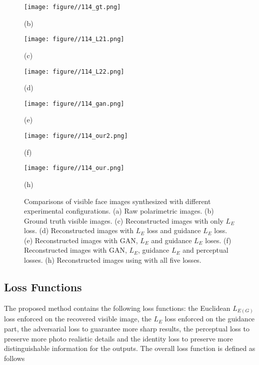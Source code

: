 \documentclass[10pt,twocolumn,letterpaper]{article}
\begin{document}
\begin{figure*}[!]
	\begin{minipage}{.135\textwidth}
		\centering
		\texttt{[image: figure//114\_gt.png]}
		\captionsetup{labelformat=empty}
		\captionsetup{justification=centering}
		\caption*{(b)}
	\end{minipage}
	\begin{minipage}{.135\textwidth}
		\centering
		\texttt{[image: figure//114\_L21.png]}
		\captionsetup{labelformat=empty}
		\captionsetup{justification=centering}
    	\caption*{(c)}
	\end{minipage}	
	\begin{minipage}{.135\textwidth}
			\centering
			\texttt{[image: figure//114\_L22.png]}
			\captionsetup{labelformat=empty}
			\captionsetup{justification=centering}
			\caption*{(d)}
	\end{minipage}
	\begin{minipage}{.135\textwidth}
		\centering
		\texttt{[image: figure//114\_gan.png]}
		\captionsetup{labelformat=empty}
		\captionsetup{justification=centering}
		\caption*{(e)}
	\end{minipage}
	\begin{minipage}{.135\textwidth}
		\centering
		\texttt{[image: figure//114\_our2.png]}
		\captionsetup{labelformat=empty}
		\captionsetup{justification=centering}
    	\caption*{(f)}
	\end{minipage}
	\begin{minipage}{.135\textwidth}
		\centering
		\texttt{[image: figure//114\_our.png]}
		\captionsetup{labelformat=empty}
		\captionsetup{justification=centering}
    	\caption*{(h)}
	\end{minipage}
	\vskip -8pt\caption{Comparisons of visible face images synthesized with different experimental configurations. (a) Raw polarimetric images. (b) Ground truth visible images. (c) Reconstructed images with only $L_E$ loss.
	(d) Reconstructed images with $L_E$ loss and guidance $L_E$ loss. (e) Reconstructed images with GAN, $L_E$ and guidance $L_E$ loses.  (f) Reconstructed images with GAN, $L_E$, guidance $L_E$ and perceptual losses. (h) Reconstructed images using with all five losses. } \label{fig:ablation}
\end{figure*}

\subsection{Loss Functions} 
The proposed method contains the following loss functions: the Euclidean $L_{E(G)}$ loss  enforced on the recovered visible image, the $L_E$ loss enforced on the guidance part,  the adversarial loss to guarantee more sharp results, the perceptual loss to preserve more photo realistic details and the identity loss to preserve more distinguishable information for the outputs. The overall loss function is defined as follows
\end{document}
